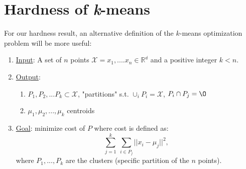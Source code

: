 \section{Hardness of \emph{k}-means}

For our hardness result, an alternative definition of the $k$-means
optimization problem will be more useful: 
\begin{enumerate}
\item \underline{Input}: A set of $n$ points $\mathcal{X} =
  x_1,....x_n \in \mathbb{R^d}$ and a positive integer $k<n$. 
\item \underline{Output}: 
\begin{enumerate}
\item $P_1,P_2,...P_k  \subset  \mathcal{X}$, "partitions"
  s.t. $\cup_i P_i = \mathcal{X}$, $P_i \cap P_j = \O$
\item $\mu_1,\mu_2,...,\mu_k$ centroids
\end{enumerate}
\item \underline{Goal}: minimize cost of $P$ where cost is defined
  as:
  \[\sum_{j=1}^{k} \ \sum_{i\in P_j} || x_i - \mu_j || ^2,\]
  where $P_1,..., P_k$ are the clusters (specific partition of the $n$
  points).
\end{enumerate}

